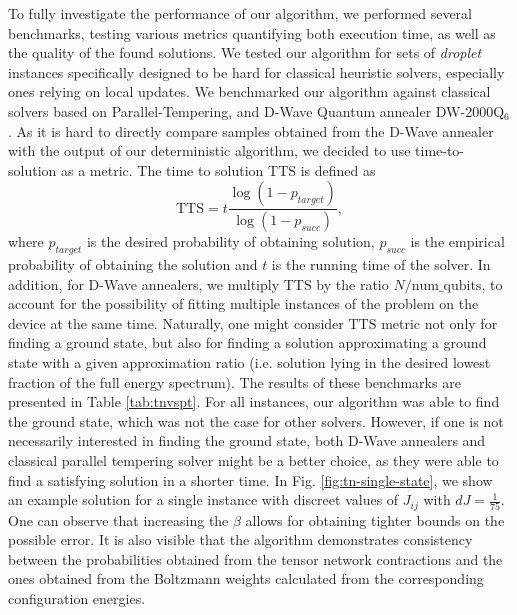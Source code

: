 To fully investigate the performance of our algorithm, we performed several
benchmarks, testing various metrics quantifying both execution time, as well as
the quality of the found solutions. We tested our algorithm for sets of
\emph{droplet} instances specifically designed to be hard for classical
heuristic solvers, especially ones relying on local updates. We benchmarked our
algorithm against classical solvers based on Parallel-Tempering, and D-Wave
Quantum annealer DW-2000Q$_6$. As it is hard to directly compare samples
obtained from the D-Wave annealer with the output of our deterministic
algorithm, we decided to use time-to-solution as a metric. The time to solution
$\mbox{TTS}$ is defined as
\begin{equation}
  \label{eq:tts}
  \mbox{TTS} = t \frac{\log(1 - p_{target})}{\log(1 - p_{succ})},
\end{equation}
where $p_{target}$ is the desired probability of obtaining solution, $p_{succ}$
is the empirical probability of obtaining the solution and $t$ is the running
time of the solver. In addition, for D-Wave annealers, we multiply $\mbox{TTS}$
by the ratio $N/\mbox{num\_qubits}$, to account for the possibility of fitting
multiple instances of the problem on the device at the same time. Naturally,
one might consider $\mbox{TTS}$ metric not only for finding a ground state, but
also for finding a solution approximating a ground state with a given
approximation ratio (i.e. solution lying in the desired lowest fraction of the
full energy spectrum). The results of these benchmarks are presented in Table
\ref{tab:tnvspt}. For all instances, our algorithm was able to find the ground
state, which was not the case for other solvers. However, if one is not
necessarily interested in finding the ground state, both D-Wave annealers and
classical parallel tempering solver might be a better choice, as they were able
to find a satisfying solution in a shorter time. In Fig.
\ref{fig:tn-single-state}, we show an example solution for a single instance
with discreet values of $J_{ij}$ with $dJ=\frac{1}{75}$. One can observe that
increasing the $\beta$ allows for obtaining tighter bounds on the possible
error. It is also visible that the algorithm demonstrates consistency between
the probabilities obtained from the tensor network contractions and the ones
obtained from the Boltzmann weights calculated from the corresponding
configuration energies.


